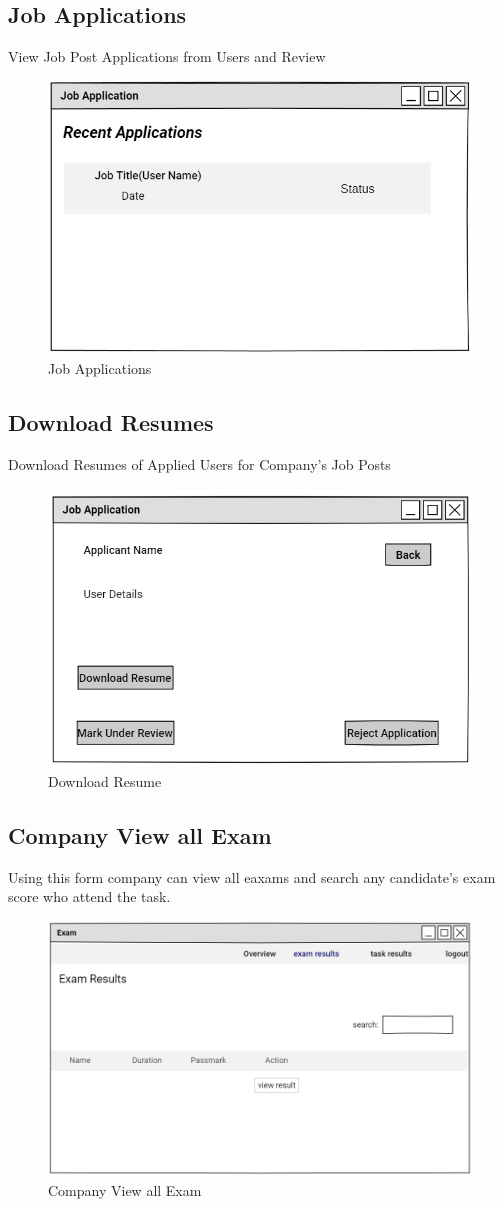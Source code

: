 \documentclass[a4paper,12pt]{report}
\begin{document}
\subsection {Job Applications}
View Job Post Applications from Users and Review
\begin{figure}[bph]
	\centering
	\includegraphics[width=.7\linewidth]{img/company/jobapltns}
	\caption{Job Applications}
\end{figure}
\pagebreak

\subsection {Download Resumes}
Download Resumes of Applied Users for Company's Job Posts
\begin{figure}[bph]
	\centering
	\includegraphics[width=.7\linewidth]{img/company/download_resume}
	\caption{Download Resume}
\end{figure}
\pagebreak
\subsection {Company View all Exam }
Using this form company can view all eaxams and search any candidate's exam score who attend the task.
\begin{figure}[bph]
	\centering
	\includegraphics[width=.6\linewidth]{img/company/ce1}
	\caption{Company View all Exam}
\end{figure}
\pagebreak
\end{document}
